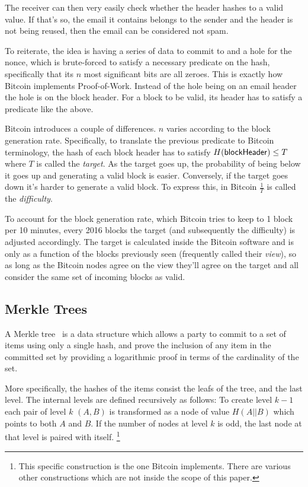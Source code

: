 The receiver can then very easily check whether the header hashes to a valid value. If that's so, the email it contains belongs to the sender and the header is not being reused, then the email can be considered not spam.

To reiterate, the idea is having a series of data to commit to and a hole for the nonce, which is brute-forced to satisfy a necessary predicate on the hash, specifically that its $n$ most significant bits are all zeroes. This is exactly how Bitcoin implements Proof-of-Work. Instead of the hole being on an email header the hole is on the block header. For a block to be valid, its header has to satisfy a predicate like the above.

Bitcoin introduces a couple of differences. $n$ varies according to the block generation rate. Specifically, to translate the previous predicate to Bitcoin terminology, the hash of each block header has to satisfy $H({\sf blockHeader}) \le T$ where $T$ is called the \emph{target}. As the target goes up, the probability of being below it goes up and generating a valid block is easier. Conversely, if the target goes down it's harder to generate a valid block. To express this, in Bitcoin $\frac{1}{T}$ is called the \emph{difficulty}.

To account for the block generation rate, which Bitcoin tries to keep to 1 block per 10 minutes, every 2016 blocks the target (and subsequently the difficulty) is adjusted accordingly. The target is calculated inside the Bitcoin software and is only as a function of the blocks previously seen (frequently called their \emph{view}), so as long as the Bitcoin nodes agree on the view they'll agree on the target and all consider the same set of incoming blocks as valid.

\subsection{Merkle Trees}
A Merkle tree~\cite{merkle} is a data structure which allows a party to commit to a set of items using only a single hash, and prove the inclusion of any item in the committed set by providing a logarithmic proof in terms of the cardinality of the set.

More specifically, the hashes of the items consist the leafs of the tree, and the last level. The internal levels are defined recursively as follows: To create level $k-1$ each pair of level $k$ $(A, B)$ is transformed as a node of value $H(A || B)$ which points to both $A$ and $B$. If the number of nodes at level $k$ is odd, the last node at that level is paired with itself.
\footnote{This specific construction is the one Bitcoin implements. There are various other constructions which are not inside the scope of this paper.}


